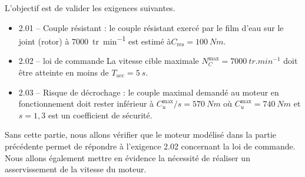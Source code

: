 \normalfalse \difficiletrue \tdifficilefalse
\correctionfalse



\setcounter{question}{0}%
\ifcorrection
\else
{}
\fi

\ifprof
\else


\begin{obj}
L'objectif est de valider les exigences suivantes.
\begin{itemize}
\item 2.01 -- Couple résistant : le couple résistant exercé par le film d’eau sur le joint (rotor) à \SI{7 000}{tr.min^{-1}} est estimé à$C_{\text{res}} = \SI{100}{N}{m}$. 
\item 2.02 -- loi de commande La vitesse cible maximale $N^{\text{max}}_C = \SI{7 000}{tr.min^{-1}}$ doit être atteinte en moins de $T_{\text{acc}} = \SI{5}{s}$.
\item 2.03 -- Risque de décrochage : le couple maximal demandé au moteur en fonctionnement doit
rester inférieur à $C^{\text{max}}_u /s = \SI{570}{Nm}$ où $C^{\text{max}}_u = \SI{740}{Nm}$ et
$s = 1,3$ est un coefficient de sécurité.
\end{itemize}

Sans cette partie, nous allons vérifier que le moteur modélisé dans la partie
précédente permet de répondre à l’exigence 2.02 concernant la loi de commande. Nous
allons également mettre en évidence la nécessité de réaliser un asservissement de la vitesse
du moteur.
\end{obj}

